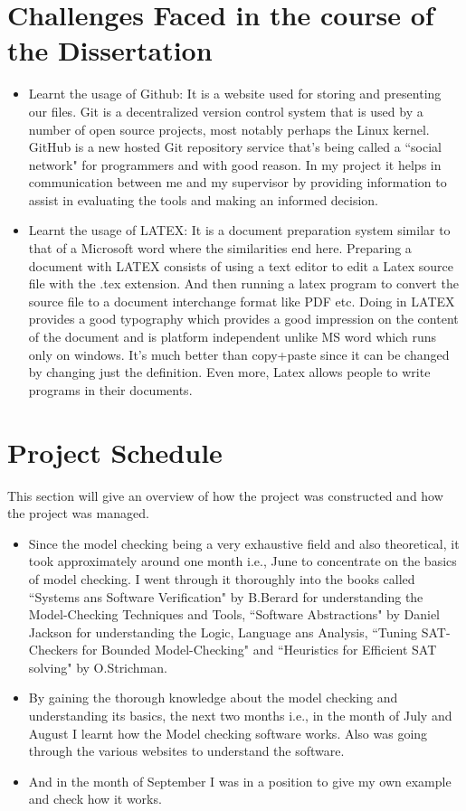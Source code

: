 \documentclass[a4paper,12pt]{report}
\begin{document}
\begin{onehalfspacing}
\section{Challenges Faced in the course of the Dissertation}
\label{Challenges faced}

\begin{itemize}
\item Learnt the usage of Github: It is a website used for storing and presenting our files. Git is a decentralized version control system that is used by a number of open source projects, most notably perhaps the Linux kernel. GitHub is a new hosted Git repository service that's being called a ``social network" for programmers and with good reason. In my project it helps in communication between me and my supervisor by providing information to assist in evaluating the tools and making an informed decision.
\item Learnt the usage of LATEX: It is a document preparation system similar to that of a Microsoft word where the similarities end here. Preparing a document with LATEX consists of using a text editor to edit a Latex source file with the .tex extension. And then running a latex program to convert the source file to a document interchange format like PDF etc. Doing in LATEX provides a good typography which provides a good impression on the content of the document and is platform independent unlike MS word which runs only on windows. It's much better than copy+paste since it can be changed by changing just the definition. Even more, Latex allows people to write programs in their documents. 
\end{itemize}

\section{Project Schedule}
\label{Project Schd}
This section will give an overview of how the project was constructed and how the project was managed.
\begin{itemize}
\item Since the model checking being a very exhaustive field and also theoretical, it took approximately around one month i.e., June to concentrate on the basics of  model checking. I went through it thoroughly into the books called ``Systems ans Software Verification" by B.Berard for understanding the Model-Checking Techniques and Tools, ``Software Abstractions" by Daniel Jackson for understanding the Logic, Language ans Analysis, ``Tuning SAT-Checkers for Bounded Model-Checking" and ``Heuristics for Efficient SAT solving" by O.Strichman.
\item  By gaining the thorough knowledge about the model checking and understanding its basics, the next two months i.e., in the month of July and August I learnt how the Model checking software works. Also was going through the various websites to understand the software.
\item And in the month of September I was in a position to give my own example and check how it works.
\end{itemize}

\end{onehalfspacing}
\end{document}
